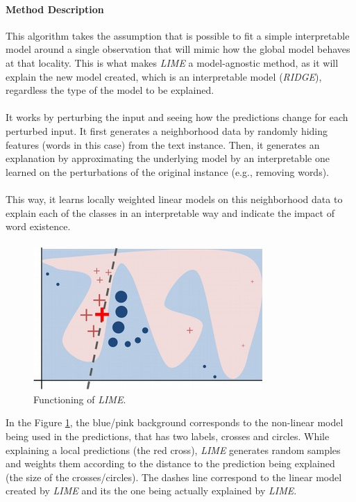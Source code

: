\paragraph{Method Description} This algorithm takes the assumption that is possible to fit a simple interpretable model around a single observation that will mimic how the global model behaves at that locality. This is what makes \emph{LIME} a model-agnostic method, as it will explain the new model created, which is an interpretable model (\emph{RIDGE}), regardless the type of the model to be explained.
\paragraph{}
It works by perturbing the input and seeing how the predictions change for each perturbed input. It first generates a neighborhood data by randomly hiding features (words in this case) from the text instance.  Then, it generates an explanation by approximating the underlying model by an interpretable one learned on the perturbations of the original instance (e.g., removing words).
\paragraph{}
This way, it learns locally weighted linear models on this neighborhood data to explain each of the classes in an interpretable way and indicate the impact of word existence.
\paragraph{}
\begin{figure}
	\centering
	\includegraphics[scale=0.55]{images/lime-explanation}
	\caption{Functioning of \emph{LIME}.}
	\label{fig:lime-ex}
\end{figure}
In the Figure \ref{fig:lime-ex}, the blue/pink background corresponds to the non-linear model being used in the predictions, that has two labels, crosses and circles. While explaining a local predictions (the red cross), \emph{LIME} generates random samples and weights them according to the distance to the prediction being explained (the size of the crosses/circles). The dashes line correspond to the linear model created by \emph{LIME} and its the one being actually explained by \emph{LIME}.


